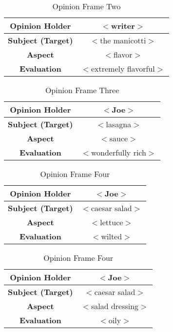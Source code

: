 \documentclass[11pt]{article}
\begin{document}
 \begin{table}[H]
\centering
{\renewcommand{\arraystretch}{1.2}%
\begin{tabular}{| c | c |}
\hline
\textbf{Opinion Holder} & $<$writer$>$\\ \hline
\textbf{Subject (Target)} & $<$the manicotti$>$ \\ \hline
\textbf{Aspect} & $<$flavor$>$ \\ \hline
\textbf{Evaluation} & $<$extremely flavorful$>$ \\ \hline
\end{tabular}}
\caption{Opinion Frame Two}
\end{table}

 \begin{table}[H]
\centering
{\renewcommand{\arraystretch}{1.2}%
\begin{tabular}{| c | c |}
\hline
\textbf{Opinion Holder} & $<$Joe$>$\\ \hline
\textbf{Subject (Target)} & $<$lasagna$>$ \\ \hline
\textbf{Aspect} & $<$sauce$>$ \\ \hline
\textbf{Evaluation} & $<$wonderfully rich$>$ \\ \hline
\end{tabular}}
\caption{Opinion Frame Three}
\end{table}

 \begin{table}[H]
\centering
{\renewcommand{\arraystretch}{1.2}%
\begin{tabular}{| c | c |}
\hline
\textbf{Opinion Holder} & $<$Joe$>$\\ \hline
\textbf{Subject (Target)} & $<$caesar salad$>$ \\ \hline
\textbf{Aspect} & $<$lettuce$>$ \\ \hline
\textbf{Evaluation} & $<$wilted$>$ \\ \hline
\end{tabular}}
\caption{Opinion Frame Four}
\end{table}

\begin{table}[H]
\centering
{\renewcommand{\arraystretch}{1.2}%
\begin{tabular}{| c | c |}
\hline
\textbf{Opinion Holder} & $<$Joe$>$\\ \hline
\textbf{Subject (Target)} & $<$caesar salad$>$ \\ \hline
\textbf{Aspect} & $<$salad dressing$>$ \\ \hline
\textbf{Evaluation} & $<$oily$>$ \\ \hline
\end{tabular}}
\caption{Opinion Frame Four}
\end{table}
\end{document}
